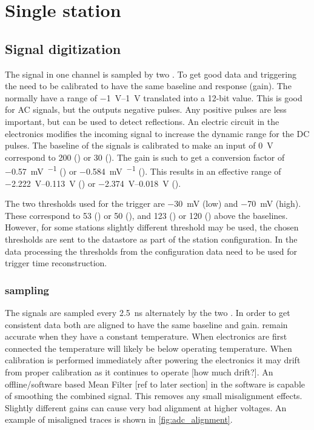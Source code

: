 \chapter{Single \hisparc station}
\label{ch:station}

\section{Signal digitization}

The signal in one channel is sampled by two \adcs. To get good data and triggering the \adcs need to be calibrated to have the same baseline and response (gain). The \adcs normally have a range of \SIrange{-1}{1}{\volt} translated into a 12-bit value. This is good for AC signals, but the \pmt outputs negative pulses. Any positive pulses are less important, but can be used to detect reflections. An electric circuit in the \hisparc electronics modifies the incoming signal to increase the dynamic range for the DC pulses. The baseline of the signals is calibrated to make an input of \SI{0}{\volt} correspond to \SI{200}{\adc} (\hisparcii) or \SI{30}{\adc} (\hisparciii). The gain is such to get a conversion factor of \SI{-0.57}{\milli\volt\per\adc} (\hisparcii) or \SI{-0.584}{\milli\volt\per\adc} (\hisparciii). This results in an effective range of \SIrange{-2.222}{0.113}{\volt} (\hisparcii) or \SIrange{-2.374}{0.018}{\volt} (\hisparciii).

The two thresholds used for the trigger are \SI{-30}{\milli\volt} (low) and  \SI{-70}{\milli\volt} (high). These correspond to \SI{53}{\adc} (\hisparcii) or \SI{50}{\adc} (\hisparciii), and \SI{123}{\adc} (\hisparcii) or \SI{120}{\adc} (\hisparciii) above the baselines. However, for some stations slightly different threshold may be used, the chosen thresholds are sent to the datastore as part of the station configuration. In the data processing the thresholds from the configuration data need to be used for trigger time reconstruction.


\subsection{\adc sampling}

The \pmt signals are sampled every \SI{2.5}{\ns} alternately by the two \adcs.
In order to get consistent data both \adcs are aligned to have the same baseline and gain. \adcs remain accurate when they have a constant temperature. When \hisparc electronics are first connected the temperature will likely be below operating temperature. When calibration is performed immediately after powering the electronics it may drift from proper calibration as it continues to operate [how much drift?]. An offline/software based Mean Filter [ref to later section] in the software is capable of smoothing the combined signal. This removes any small misalignment effects. Slightly different gains can cause very bad alignment at higher voltages. An example of misaligned traces is shown in \cref{fig:adc_alignment}.

